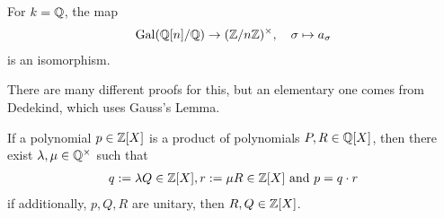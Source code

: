 \begin{thm}[]\label{thm:4-26}
  For $k = \mathbb{Q}$, the map
  \begin{align*}
    \operatorname{Gal}(\mathbb{Q}[n]/\mathbb{Q}) \to (\mathbb{Z}/n\mathbb{Z})^{\times}, \quad \sigma \mapsto a_{\sigma}
  \end{align*}
is an isomorphism.
\end{thm}
There are many different proofs for this, but an elementary one comes from Dedekind, which uses Gauss's Lemma.
\begin{lem}[Gauss]
  If a polynomial $p \in \mathbb{Z}[X]$ is a product of polynomials $P,R \in \mathbb{Q}[X]$, then there exist $\lambda,\mu \in \mathbb{Q}^{\times}$ such that
  \begin{align*}
    q:= \lambda Q \in \mathbb{Z}[X], r:= \mu R \in \mathbb{Z}[X] \text{ and } p = q \cdot r
  \end{align*}
  if additionally, $p,Q,R$ are unitary, then $R,Q \in \mathbb{Z}[X]$.
\end{lem}
